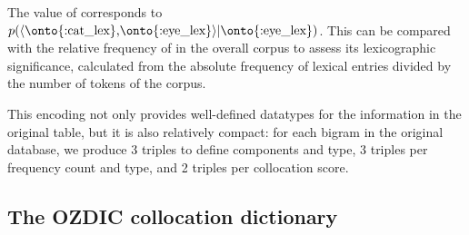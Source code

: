 \documentclass[output=paper,colorlinks,citecolor=brown]{langscibook}
\begin{document}
\begin{sloppypar}
\noindent The value of  corresponds to $p(\langle \text{\onto{:cat\_lex},\onto{:eye\_lex}} \rangle | \text{\onto{:eye\_lex}})$.
This can be compared with the relative frequency of  in the overall corpus to assess its lexicographic significance, calculated from the absolute frequency of lexical entries divided by the  number of tokens of the corpus.
\end{sloppypar}

This encoding not only provides well-defined da\-ta\-ty\-pes for the information in the original table, but it is also relatively compact: for each bigram in the original database, we produce 3 triples to define components and type, 3 triples per frequency count and type, and 2 triples per collocation score.




\subsection{The OZDIC collocation dictionary} %
\label{sec:use_case_ozdoc_dict}
\end{document}
